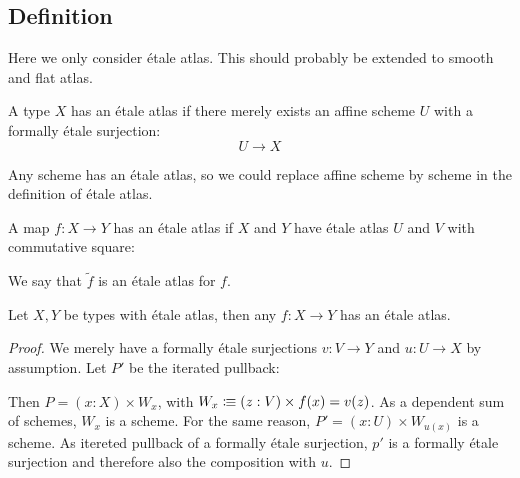 \subsection{Definition}

\begin{remark}
Here we only consider étale atlas. This should probably be extended to smooth and flat atlas.
\end{remark}

\begin{definition}
A type $X$ has an étale atlas if there merely exists an affine scheme $U$ with a formally étale surjection:
\[U\to X\]
\end{definition}

\begin{remark}
Any scheme has an étale atlas, so we could replace affine scheme by scheme in the definition of étale atlas.
\end{remark}

\begin{definition}
A map $f:X\to Y$ has an étale atlas if $X$ and $Y$ have étale atlas $U$ and $V$ with commutative square:
  \begin{center}
  \end{center}
We say that $\widetilde{f}$ is an étale atlas for $f$.
\end{definition}

\begin{lemma}
  Let $X,Y$ be types with étale atlas, then any $f:X\to Y$ has an étale atlas.
\end{lemma}

\begin{proof}
  We merely have a formally étale surjections $v:V\to Y$ and $u:U\to X$ by assumption.
  Let $P'$ be the iterated pullback:
  \begin{center}
  \end{center}
  Then $P=(x:X)\times W_x$, with $W_x\vcentcolon\mspace{-1.2mu}\equiv (z:V)\times f(x)=v(z)$.
  As a dependent sum of schemes, $W_x$ is a scheme.
  For the same reason, $P'=(x:U)\times W_{u(x)}$ is a scheme.
  As itereted pullback of a formally étale surjection,
  $p'$ is a formally étale surjection and
  therefore also the composition with $u$.
\end{proof}

